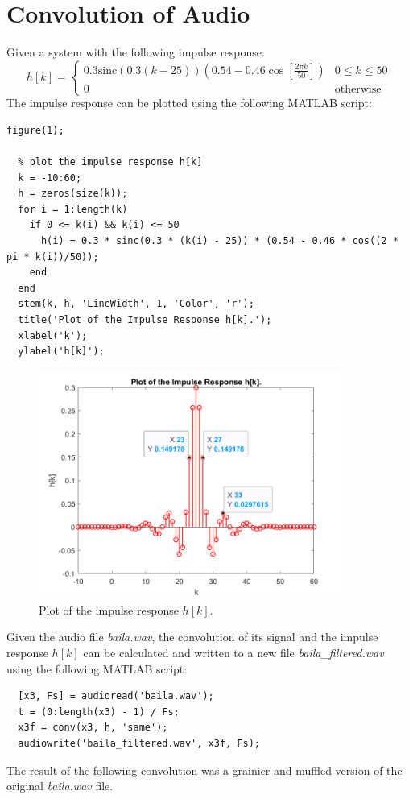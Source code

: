 \documentclass[a4paper, 10pt]{article}
\begin{document}
\section{Convolution of Audio}
Given a system with the following impulse response:
\begin{equation}
  h[k]  =
  \begin{cases}
    0.3\mathrm{sinc}(0.3(k-25)) \left(0.54-0.46\cos[\frac{2\pi k}{50}]\right) & 0\leq k\leq 50\\
    0 & \text{otherwise}
  \end{cases}
\end{equation}
The impulse response can be plotted using the following MATLAB script:
\begin{lstlisting}[style=Matlab-editor, basicstyle=\small\ttfamily]
  figure(1);

  % plot the impulse response h[k]
  k = -10:60;
  h = zeros(size(k));
  for i = 1:length(k)
    if 0 <= k(i) && k(i) <= 50
      h(i) = 0.3 * sinc(0.3 * (k(i) - 25)) * (0.54 - 0.46 * cos((2 * pi * k(i))/50));
    end
  end
  stem(k, h, 'LineWidth', 1, 'Color', 'r');
  title('Plot of the Impulse Response h[k].');
  xlabel('k');
  ylabel('h[k]');  
\end{lstlisting}
\begin{figure}[H]
  \centering
  \includegraphics[width=10cm]{images/q2_impulse.png}
  \caption{Plot of the impulse response $h[k]$.}
\end{figure}
Given the audio file \textit{baila.wav}, the convolution of its signal and the impulse response $h[k]$ can 
be calculated and written to a new file \textit{baila\_filtered.wav} using the following MATLAB script:
\begin{lstlisting}[style=Matlab-editor, basicstyle=\small\ttfamily]
  % read baila.wav audio file
  [x3, Fs] = audioread('baila.wav');
  t = (0:length(x3) - 1) / Fs;
  x3f = conv(x3, h, 'same');
  audiowrite('baila_filtered.wav', x3f, Fs);
\end{lstlisting}
The result of the following convolution was a grainier and muffled version of the original \textit{baila.wav} file.
\end{document}
